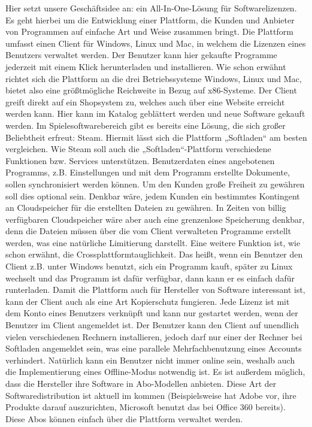 Hier setzt unsere Geschäftsidee an: ein All-In-One-Lösung für Softwarelizenzen. Es geht hierbei um die Entwicklung einer Plattform, die Kunden und Anbieter von Programmen auf einfache Art und Weise zusammen bringt. Die Plattform umfasst einen Client für Windows, Linux und Mac, in welchem die Lizenzen eines Benutzers verwaltet werden. Der Benutzer kann hier gekaufte Programme jederzeit mit einem Klick herunterladen und installieren. Wie schon erwähnt richtet sich die Plattform an die drei Betriebssysteme Windows, Linux und Mac, bietet also eine größtmögliche Reichweite in Bezug auf x86-Systeme. Der Client greift direkt auf ein Shopsystem zu, welches auch über eine Website erreicht werden kann. Hier kann im Katalog geblättert werden und neue Software gekauft werden. Im Spielesoftwarebereich gibt es bereits eine Lösung, die sich großer Beliebtheit erfreut: Steam. Hiermit lässt sich die Plattform „Softladen“ am besten vergleichen. Wie Steam soll auch die „Softladen“-Plattform verschiedene Funktionen bzw. Services unterstützen. Benutzerdaten eines angebotenen Programms, z.B. Einstellungen und mit dem Programm erstellte Dokumente, sollen synchronisiert werden können. Um den Kunden große Freiheit zu gewähren soll dies optional sein. Denkbar wäre, jedem Kunden ein bestimmtes Kontingent an Cloudspeicher für die erstellten Dateien zu gewähren. In Zeiten von billig verfügbaren Cloudspeicher wäre aber auch eine grenzenlose Speicherung denkbar, denn die Dateien müssen über die vom Client verwalteten Programme erstellt werden, was eine natürliche Limitierung darstellt. 
Eine weitere Funktion ist, wie schon erwähnt, die Crossplattformtauglichkeit. Das heißt, wenn ein Benutzer den Client z.B. unter Windows benutzt, sich ein Programm kauft, später zu Linux wechselt und das Programm ist dafür verfügbar, dann kann er es einfach dafür runterladen.
Damit die Plattform auch für Hersteller von Software interessant ist, kann der Client auch als eine Art Kopierschutz fungieren. Jede Lizenz ist mit dem Konto eines Benutzers verknüpft und kann nur gestartet werden, wenn der Benutzer im Client angemeldet ist. Der Benutzer kann den Client auf unendlich vielen verschiedenen Rechnern installieren, jedoch darf nur einer der Rechner bei Softladen angemeldet sein, was eine parallele Mehrfachbenutzung eines Accounts verhindert. Natürlich kann ein Benutzer nicht immer online sein, weshalb auch die Implementierung eines Offline-Modus notwendig ist. Es ist außerdem möglich, dass die Hersteller ihre Software in Abo-Modellen anbieten. Diese Art der Softwaredistribution ist aktuell im kommen (Beispielsweise hat Adobe vor, ihre Produkte darauf auszurichten, Microsoft benutzt das bei Office 360 bereits). Diese Abos können einfach über die Plattform verwaltet werden.
